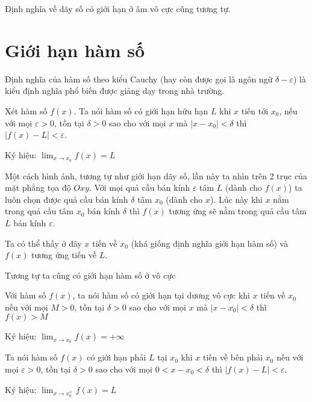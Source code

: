 Định nghĩa về dãy số có giới hạn ở âm vô cực cũng tương tự.

\section{Giới hạn hàm số}

Định nghĩa của hàm số theo kiểu Cauchy (hay còn được gọi là
ngôn ngữ $\delta-\varepsilon$) là kiểu định nghĩa phổ biến được
giảng dạy trong nhà trường.

\begin{definition}
    Xét hàm số $f(x)$. Ta nói hàm số có giới hạn hữu hạn $L$
    khi $x$ tiến tới $x_0$, nếu với mọi $\varepsilon > 0$, tồn tại 
    $\delta > 0$ sao cho với mọi $x$ mà $| x - x_0 | < \delta$ thì
    $|f(x) - L| < \varepsilon$.

    Ký hiệu: $\displaystyle{\lim_{x \to x_0} f(x) = L}$
\end{definition}

Một cách hình ảnh, tương tự như giới hạn dãy số, lần này ta nhìn trên 2 trục 
của mặt phẳng tọa độ $Oxy$. Với mọi quả cầu bán kính $\varepsilon$ tâm $L$ (dành cho $f(x)$)
ta luôn chọn được quả cầu bán kính $\delta$ tâm $x_0$ (dành cho $x$). Lúc này khi $x$
nằm trong quả cầu tâm $x_0$ bán kính $\delta$ thì $f(x)$ tương ứng sẽ nằm trong quả cầu
tâm $L$ bán kính $\varepsilon$.

Ta có thể thấy ở đây $x$ tiến về $x_0$ (khá giống định nghĩa giới hạn hàm số)
và $f(x)$ tương ứng tiến về $L$.

Tương tự ta cũng có giới hạn hàm số ở vô cực

\begin{definition}
    Với hàm số $f(x)$, ta nói hàm số có giới hạn tại dương vô cực
    khi $x$ tiến về $x_0$ nếu với mọi $M > 0$, tồn tại $\delta > 0$ sao cho với mọi $x$ mà $|x - x_0| < \delta$ 
    thì $f(x) > M$

    Ký hiệu: $\displaystyle{\lim_{x \to x_0} f(x) = +\infty}$
\end{definition}

\begin{definition}
    Ta nói hàm số $f(x)$ có giới hạn phải $L$ tại $x_0$ khi $x$ tiến về bên phải $x_0$
    nếu với mọi $\varepsilon > 0$, tồn tại $\delta > 0$ sao cho với mọi $0 < x - x_0 < \delta$ 
    thì $|f(x) - L| < \varepsilon$.

    Ký hiệu: $\displaystyle{\lim_{x \to x_0^+} f(x) = L}$
\end{definition}

